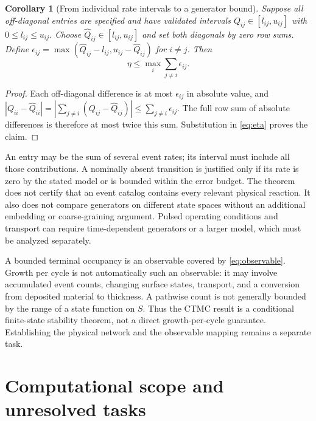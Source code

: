 \documentclass[11pt,a4paper]{article}
\theoremstyle{plain}
\newtheorem{corollary}[theorem]{Corollary}
\theoremstyle{definition}
\theoremstyle{remark}
\begin{document}
\begin{corollary}[From individual rate intervals to a generator bound]
\label{cor:rates-generator}
Suppose all off-diagonal entries are specified and have validated intervals
$Q_{ij}\in[l_{ij},u_{ij}]$ with $0\le l_{ij}\le u_{ij}$.
Choose $\widehat Q_{ij}\in[l_{ij},u_{ij}]$ and set both diagonals by
zero row sums. Define
$\epsilon_{ij}=\max(\widehat Q_{ij}-l_{ij},u_{ij}-\widehat Q_{ij})$
for $i\ne j$. Then
\begin{equation}
 \eta\le\max_i\sum_{j\ne i}\epsilon_{ij}.
 \label{eq:rate-generator}
\end{equation}
\end{corollary}
\begin{proof}
Each off-diagonal difference is at most $\epsilon_{ij}$ in absolute
value, and
$|Q_{ii}-\widehat Q_{ii}|=
|\sum_{j\ne i}(Q_{ij}-\widehat Q_{ij})|
\le\sum_{j\ne i}\epsilon_{ij}$.
The full row sum of absolute differences is therefore at most twice this
sum. Substitution in \eqref{eq:eta} proves the claim.
\end{proof}

An entry may be the sum of several event rates; its interval must include
all those contributions. A nominally absent transition is justified only if
its rate is zero by the stated model or is bounded within the error budget.
The theorem does not certify that an event catalog contains every relevant
physical reaction. It also does not compare generators on different state
spaces without an additional embedding or coarse-graining argument. Pulsed
operating conditions and transport can require time-dependent generators or
a larger model, which must be analyzed separately.

A bounded terminal occupancy is an observable covered by
\eqref{eq:observable}. Growth per cycle is not automatically such an
observable: it may involve accumulated event counts, changing surface states,
transport, and a conversion from deposited material to thickness. A pathwise
count is not generally bounded by the range of a state function on $S$.
Thus the CTMC result is a conditional finite-state stability theorem, not a
direct growth-per-cycle guarantee. Establishing the physical network and the
observable mapping remains a separate task.

\section{Computational scope and unresolved tasks}
\label{sec:complexity}
\end{document}

